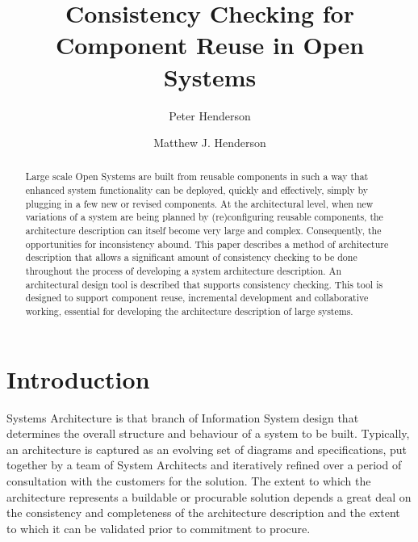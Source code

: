 \documentclass{llncs}
\begin{document}
\title{Consistency Checking for Component Reuse in Open Systems}
%
\author{Peter Henderson \and Matthew J. Henderson
}

\maketitle              %

\begin{abstract}
Large scale Open Systems are built from reusable components in such a way that enhanced system functionality can be deployed, quickly and effectively, simply by plugging in a few new or revised components. At the architectural level, when new variations of a system are being planned by (re)configuring reusable components, the architecture description can itself become very large and complex. Consequently, the opportunities for inconsistency abound. This paper describes a method of architecture description that allows a significant amount of consistency checking to be done throughout the process of developing a system architecture description. An architectural design tool is described that supports consistency checking. This tool is designed to support component reuse, incremental development and collaborative working, essential for developing the architecture description of large systems. 
\end{abstract}



\section{Introduction}
\label{sec:introduction}

\noindent Systems Architecture is that branch of Information System design that determines the overall structure and behaviour of a system to be built. Typically, an architecture is captured as an evolving set of diagrams and specifications, put together by a team of System Architects and iteratively refined over a period of consultation with the customers for the solution. The extent to which the architecture represents a buildable or procurable solution depends a great deal on the consistency and completeness of the architecture description and the extent to which it can be validated prior to commitment to procure.
\end{document}
